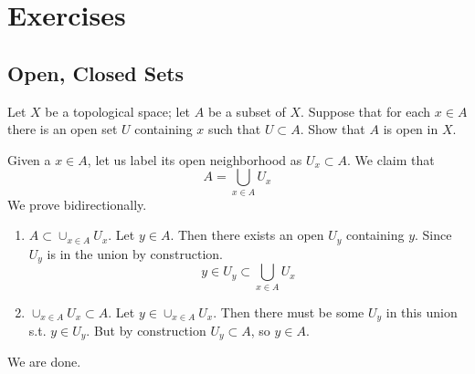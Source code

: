 \section{Exercises} 

\subsection{Open, Closed Sets}

  \begin{exercise}[Munkres 13.1]
    Let $X$ be a topological space; let $A$ be a subset of $X$. Suppose that for each $x \in A$ there is an open set $U$ containing $x$ such that $U \subset A$. Show that $A$ is open in $X$.
  \end{exercise}
  \begin{solution}[Munkres 13.1]
    Given a $x \in A$, let us label its open neighborhood as $U_x \subset A$. We claim that 
    \begin{equation}
      A = \bigcup_{x \in A} U_x
    \end{equation} 
    We prove bidirectionally. 
    \begin{enumerate}
      \item $A \subset \cup_{x \in A} U_x$. Let $y \in A$. Then there exists an open $U_y$ containing $y$. Since $U_y$ is in the union by construction. 
      \begin{equation}
        y \in U_y \subset \bigcup_{x \in A} U_x
      \end{equation}
      \item $\cup_{x \in A} U_x \subset A$. Let $y \in \cup_{x \in A} U_x$. Then there must be some $U_y$ in this union s.t. $y \in U_y$. But by construction $U_y \subset A$, so $y \in A$. 
    \end{enumerate}
    We are done. 
  \end{solution}

